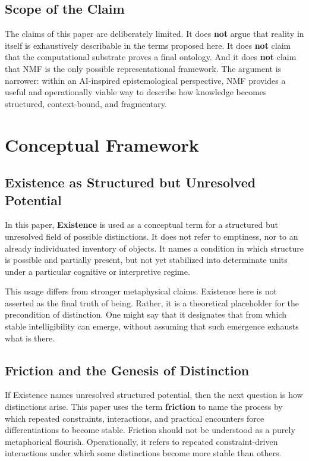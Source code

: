 \documentclass[11pt,a4paper]{article}
\newcommand{\term}[1]{\textbf{#1}}
\begin{document}
\subsection{Scope of the Claim}

The claims of this paper are deliberately limited. It does \textbf{not} argue that reality in itself is exhaustively describable in the terms proposed here. It does \textbf{not} claim that the computational substrate proves a final ontology. And it does \textbf{not} claim that NMF is the only possible representational framework. The argument is narrower: within an AI-inspired epistemological perspective, NMF provides a useful and operationally viable way to describe how knowledge becomes structured, context-bound, and fragmentary.

\section{Conceptual Framework}

\subsection{Existence as Structured but Unresolved Potential}

In this paper, \term{Existence} is used as a conceptual term for a structured but unresolved field of possible distinctions. It does not refer to emptiness, nor to an already individuated inventory of objects. It names a condition in which structure is possible and partially present, but not yet stabilized into determinate units under a particular cognitive or interpretive regime.

This usage differs from stronger metaphysical claims. Existence here is not asserted as the final truth of being. Rather, it is a theoretical placeholder for the precondition of distinction. One might say that it designates that from which stable intelligibility can emerge, without assuming that such emergence exhausts what is there.

\subsection{Friction and the Genesis of Distinction}

If Existence names unresolved structured potential, then the next question is how distinctions arise. This paper uses the term \term{friction} to name the process by which repeated constraints, interactions, and practical encounters force differentiations to become stable. Friction should not be understood as a purely metaphorical flourish. Operationally, it refers to repeated constraint-driven interactions under which some distinctions become more stable than others.
\end{document}
